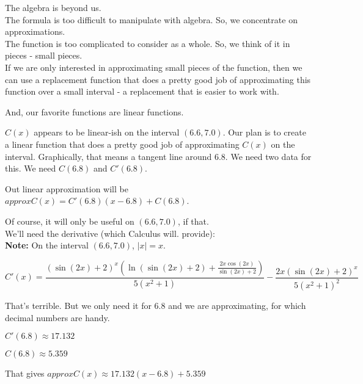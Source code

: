 \documentclass{ximera}
\begin{document}
The algebra is beyond us. \\




The formula is too difficult to manipulate with algebra.  So, we concentrate on approximations. \\ 


The function is too complicated to consider as a whole. So, we think of it in pieces - small pieces. \\






If we are only interested in approximating small pieces of the function, then we can use a replacement function that does a pretty good job of approximating this function over a small interval - a replacement that is easier to work with.

And, our favorite functions are linear functions.


$C(x)$ appears to be linear-ish on the interval $(6.6, 7.0)$. Our plan is to create a linear function that does a pretty good job of approximating $C(x)$ on the interval. Graphically, that means a tangent line around $6.8$.  We need two data for this.  We need $C(6.8)$ and $C'(6.8)$.





Out linear approximation will be $approxC(x) = C'(6.8)(x-6.8) + C(6.8)$.

Of course, it will only be useful on $(6.6, 7.0)$, if that. \\




We'll need the derivative (which Calculus will. provide): \\
\textbf{Note:} On the interval $(6.6, 7.0)$, $| x | = x$.

\[  
C'(x) = \frac{(\sin(2x)+2)^x (\ln(\sin(2x)+2) + \frac{2 x \cos(2x)}{\sin(2x)+2})}{5(x^2+1)} - \frac{2x(\sin(2x)+2)^x}{5(x^2+1)^2}
\]




That's terrible.  But we only need it for $6.8$ and we are approximating, for which decimal numbers are handy.

$C'(6.8) \approx 17.132$


$C(6.8) \approx 5.359$


That gives $approxC(x) \approx 17.132(x-6.8)+5.359$
\end{document}
